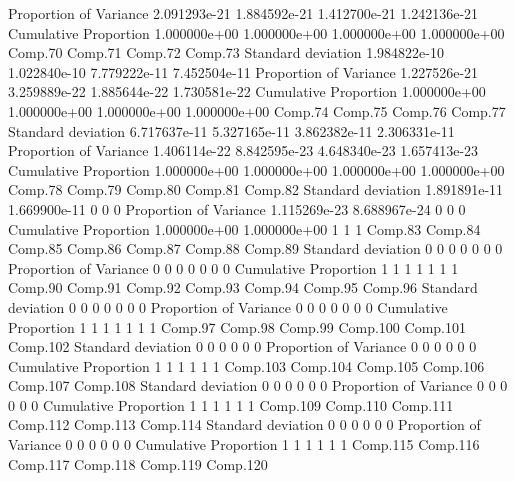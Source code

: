 \documentclass[12pt]{article}
\begin{document}
\begin{Schunk}
\begin{Soutput}
Proportion of Variance 2.091293e-21 1.884592e-21 1.412700e-21 1.242136e-21
Cumulative Proportion  1.000000e+00 1.000000e+00 1.000000e+00 1.000000e+00
                            Comp.70      Comp.71      Comp.72      Comp.73
Standard deviation     1.984822e-10 1.022840e-10 7.779222e-11 7.452504e-11
Proportion of Variance 1.227526e-21 3.259889e-22 1.885644e-22 1.730581e-22
Cumulative Proportion  1.000000e+00 1.000000e+00 1.000000e+00 1.000000e+00
                            Comp.74      Comp.75      Comp.76      Comp.77
Standard deviation     6.717637e-11 5.327165e-11 3.862382e-11 2.306331e-11
Proportion of Variance 1.406114e-22 8.842595e-23 4.648340e-23 1.657413e-23
Cumulative Proportion  1.000000e+00 1.000000e+00 1.000000e+00 1.000000e+00
                            Comp.78      Comp.79 Comp.80 Comp.81 Comp.82
Standard deviation     1.891891e-11 1.669900e-11       0       0       0
Proportion of Variance 1.115269e-23 8.688967e-24       0       0       0
Cumulative Proportion  1.000000e+00 1.000000e+00       1       1       1
                       Comp.83 Comp.84 Comp.85 Comp.86 Comp.87 Comp.88 Comp.89
Standard deviation           0       0       0       0       0       0       0
Proportion of Variance       0       0       0       0       0       0       0
Cumulative Proportion        1       1       1       1       1       1       1
                       Comp.90 Comp.91 Comp.92 Comp.93 Comp.94 Comp.95 Comp.96
Standard deviation           0       0       0       0       0       0       0
Proportion of Variance       0       0       0       0       0       0       0
Cumulative Proportion        1       1       1       1       1       1       1
                       Comp.97 Comp.98 Comp.99 Comp.100 Comp.101 Comp.102
Standard deviation           0       0       0        0        0        0
Proportion of Variance       0       0       0        0        0        0
Cumulative Proportion        1       1       1        1        1        1
                       Comp.103 Comp.104 Comp.105 Comp.106 Comp.107 Comp.108
Standard deviation            0        0        0        0        0        0
Proportion of Variance        0        0        0        0        0        0
Cumulative Proportion         1        1        1        1        1        1
                       Comp.109 Comp.110 Comp.111 Comp.112 Comp.113 Comp.114
Standard deviation            0        0        0        0        0        0
Proportion of Variance        0        0        0        0        0        0
Cumulative Proportion         1        1        1        1        1        1
                       Comp.115 Comp.116 Comp.117 Comp.118 Comp.119 Comp.120

\end{Soutput}
\end{Schunk}
\end{document}
